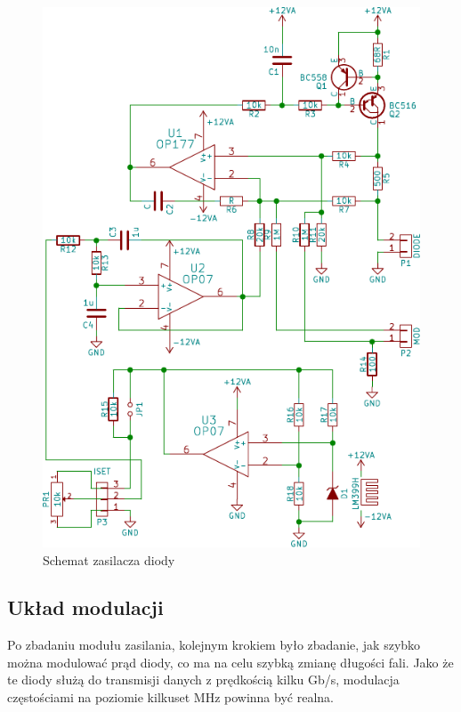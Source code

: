 \documentclass[a4paper,10pt,twoside]{article}
\begin{document}
\begin{figure}
\begin{center}
 \includegraphics{./obrazki/VcselPSU.pdf}
\end{center}
\caption{Schemat zasilacza diody}
\label{sch-psu}
\end{figure}

\subsection{Układ modulacji}

Po zbadaniu modułu zasilania, kolejnym krokiem było zbadanie, jak szybko można modulować prąd diody, co ma na celu szybką zmianę długości fali. Jako że te diody służą do transmisji danych z prędkością kilku Gb/s, modulacja częstościami na poziomie kilkuset MHz powinna być realna. 
\end{document}
